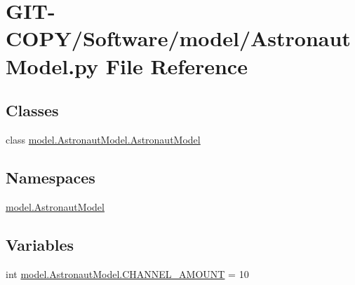 \hypertarget{GIT-COPY_2Software_2model_2AstronautModel_8py}{}\section{G\+I\+T-\/\+C\+O\+P\+Y/\+Software/model/\+Astronaut\+Model.py File Reference}
\label{GIT-COPY_2Software_2model_2AstronautModel_8py}
\subsection*{Classes}
\begin{DoxyCompactItemize}
\item 
class \hyperlink{classmodel_1_1AstronautModel_1_1AstronautModel}{model.\+Astronaut\+Model.\+Astronaut\+Model}
\end{DoxyCompactItemize}
\subsection*{Namespaces}
\begin{DoxyCompactItemize}
\item 
 \hyperlink{namespacemodel_1_1AstronautModel}{model.\+Astronaut\+Model}
\end{DoxyCompactItemize}
\subsection*{Variables}
\begin{DoxyCompactItemize}
\item 
int \hyperlink{namespacemodel_1_1AstronautModel_ae856bd5586331097b334184028678637}{model.\+Astronaut\+Model.\+C\+H\+A\+N\+N\+E\+L\+\_\+\+A\+M\+O\+U\+N\+T} = 10
\end{DoxyCompactItemize}
